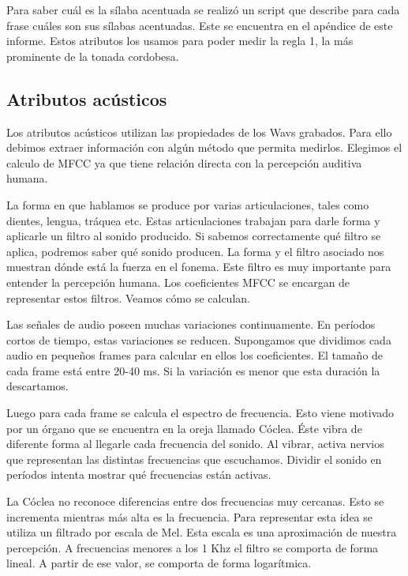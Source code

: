  Para saber cuál es la sílaba acentuada se realizó un script que describe para cada frase cuáles son sus sílabas acentuadas. Este se encuentra en el apéndice de este informe. Estos atributos los usamos para poder medir la regla 1, la más prominente de la tonada cordobesa.

\subsection{Atributos acústicos}

Los atributos acústicos utilizan las propiedades de los Wavs grabados. Para ello debimos extraer información con algún método que permita medirlos. Elegimos el calculo de MFCC ya que tiene relación directa con la percepción auditiva humana. 



La forma en que hablamos se produce por varias articulaciones, tales como dientes, lengua, tráquea etc. Estas articulaciones trabajan para darle forma y aplicarle un filtro al sonido producido. Si sabemos correctamente qué filtro se aplica, podremos saber qué sonido producen. La forma y el filtro asociado nos muestran dónde está la fuerza en el fonema. Este filtro es muy importante para entender la percepción humana. Los coeficientes MFCC se encargan de representar estos filtros. Veamos cómo se calculan.

Las señales de audio poseen muchas variaciones continuamente. En períodos cortos de tiempo, estas variaciones se reducen. Supongamos que dividimos cada audio en pequeños frames para calcular en ellos los coeficientes. El tamaño de cada frame está entre 20-40 ms. Si la variación es menor que esta duración la descartamos.

Luego para cada frame se calcula el espectro de frecuencia. Esto viene motivado por un órgano que se encuentra en la oreja llamado Cóclea. Éste vibra de diferente forma al llegarle cada frecuencia del sonido. Al vibrar, activa nervios que representan las distintas frecuencias que escuchamos. Dividir el sonido en períodos intenta mostrar qué frecuencias están activas.

La Cóclea no reconoce diferencias entre dos frecuencias muy cercanas. Esto se incrementa mientras más alta es la frecuencia. Para representar esta idea se utiliza un filtrado por escala de Mel. Esta escala es una aproximación de nuestra percepción. A frecuencias menores a los 1 Khz el filtro se comporta de forma lineal. A partir de ese valor, se comporta de forma logarítmica. 

